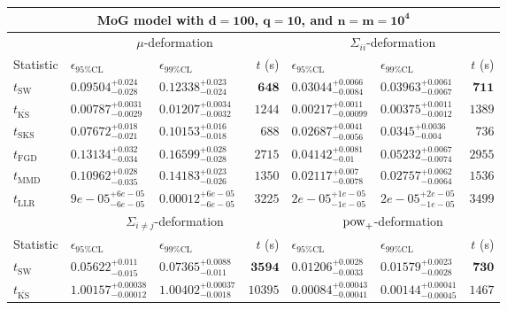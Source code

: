 \begin{tabular}{l|llr|llr}
	\toprule
	\multicolumn{7}{c}{{\bf MoG model with $\mathbf{d=100}$, $\mathbf{q=10}$, and $\mathbf{n=m=10^{4}}$}} \\
	\toprule
	\multicolumn{1}{c}{} & \multicolumn{3}{c}{$\mu$-deformation} & \multicolumn{3}{c}{$\Sigma_{ii}$-deformation} \\
	Statistic & $\epsilon_{95\%\mathrm{CL}}$ & $\epsilon_{99\%\mathrm{CL}}$ & $t$ (s) & $\epsilon_{95\%\mathrm{CL}}$ & $\epsilon_{99\%\mathrm{CL}}$ & $t$ (s) \\
	\midrule
	$t_{\mathrm{SW}}$ & $0.09504_{-0.028}^{+0.024}$ & $0.12338_{-0.024}^{+0.023}$ & ${\mathbf{648}}$ & $0.03044_{-0.0084}^{+0.0066}$ & $0.03963_{-0.0067}^{+0.0061}$ & ${\mathbf{711}}$ \\
	$t_{\overline{\mathrm{KS}}}$ & ${\mathbf{0.00787_{-0.0029}^{+0.0031}}}$ & ${\mathbf{0.01207_{-0.0032}^{+0.0034}}}$ & $1244$ & ${\mathbf{0.00217_{-0.00099}^{+0.0011}}}$ & ${\mathbf{0.00375_{-0.0012}^{+0.0011}}}$ & $1389$ \\
	$t_{\mathrm{SKS}}$ & $0.07672_{-0.021}^{+0.018}$ & $0.10153_{-0.018}^{+0.016}$ & $688$ & $0.02687_{-0.0056}^{+0.0041}$ & $0.0345_{-0.004}^{+0.0036}$ & $736$ \\
	$t_{\mathrm{FGD}}$ & $0.13134_{-0.034}^{+0.032}$ & $0.16599_{-0.028}^{+0.028}$ & $2715$ & $0.04142_{-0.01}^{+0.0081}$ & $0.05232_{-0.0074}^{+0.0067}$ & $2955$ \\
	$t_{\mathrm{MMD}}$ & $0.10962_{-0.035}^{+0.028}$ & $0.14183_{-0.026}^{+0.023}$ & $1350$ & $0.02117_{-0.0078}^{+0.007}$ & $0.02757_{-0.0064}^{+0.0062}$ & $1536$ \\
	$t_{\mathrm{LLR}}$ & $9e-05_{-6e-05}^{+6e-05}$ & $0.00012_{-6e-05}^{+6e-05}$ & $3225$ & $2e-05_{-1e-05}^{+1e-05}$ & $2e-05_{-1e-05}^{+2e-05}$ & $3499$ \\
	\toprule
	\multicolumn{1}{c}{} & \multicolumn{3}{c}{$\Sigma_{i\neq j}$-deformation} & \multicolumn{3}{c}{$\rm{pow}_{+}$-deformation} \\
	Statistic & $\epsilon_{95\%\mathrm{CL}}$ & $\epsilon_{99\%\mathrm{CL}}$ & $t$ (s) & $\epsilon_{95\%\mathrm{CL}}$ & $\epsilon_{99\%\mathrm{CL}}$ & $t$ (s) \\
	\midrule
	$t_{\mathrm{SW}}$ & $0.05622_{-0.015}^{+0.011}$ & $0.07365_{-0.011}^{+0.0088}$ & ${\mathbf{3594}}$ & $0.01206_{-0.0033}^{+0.0028}$ & $0.01579_{-0.0028}^{+0.0023}$ & ${\mathbf{730}}$ \\
	$t_{\overline{\mathrm{KS}}}$ & $1.00157_{-0.00012}^{+0.00038}$ & $1.00402_{-0.0018}^{+0.00037}$ & $10395$ & ${\mathbf{0.00084_{-0.00041}^{+0.00043}}}$ & ${\mathbf{0.00144_{-0.00045}^{+0.00041}}}$ & $1467$ \\

\end{tabular}
